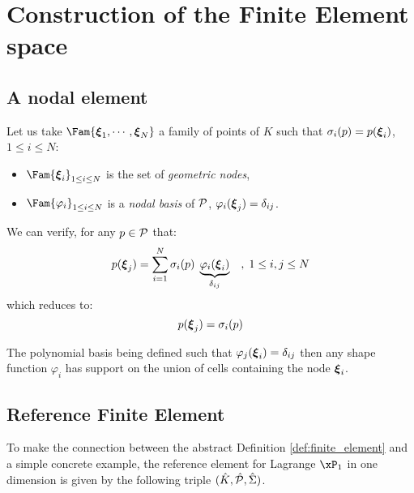 \section{Construction of the Finite Element space}

\subsection{A nodal element}

Let us take $\Fam{\Pnode_1, \cdots, \Pnode_N}$ a family of points of $K$ such that $\sigma_i(p)= p(\boldsymbol{\xi}_i)$, $1\leq i \leq N$:
\begin{itemize}
\item $\Fam{\Pnode_i}_{1\leq i \leq N}$ is the set of \textit{geometric nodes},
\item $\Fam{\varphi_i}_{1\leq i \leq N}$ is a \textit{nodal basis} of ${\mathcal P}$, \ie $\varphi_i(\boldsymbol{\xi}_j) = \delta_{ij}$.
\end{itemize}
We can verify, for any $p \in{\mathcal P}$ that:
\begin{equation*}
p(\boldsymbol{\xi}_j) = \sum_{i=1}^{N} \sigma_i(p)\; \underbrace{\varphi_i(\boldsymbol{\xi}_i)}_{\delta_{ij}}\quad,\; 1 \leq i,j \leq N
\end{equation*}
which reduces to:
\begin{equation*}
p(\boldsymbol{\xi}_j) = \sigma_i(p)
\end{equation*}

\medskip
\begin{rmrk}
The polynomial basis being defined such that $\varphi_j(\boldsymbol{\xi}_i) = \delta_{ij}$ then any shape function $\varphi_i$ has support on the union of cells containing the node $\boldsymbol{\xi}_i$.
\end{rmrk}

\subsection{Reference Finite Element}

To make the connection between the abstract Definition \ref{def:finite_element} and a simple concrete example, the reference element for Lagrange $\xP_1$ in one dimension is given by the following triple ${({\hat {{K}}},{\hat {{\mathcal P}}}, {\hat{{\Sigma}}})}$.

